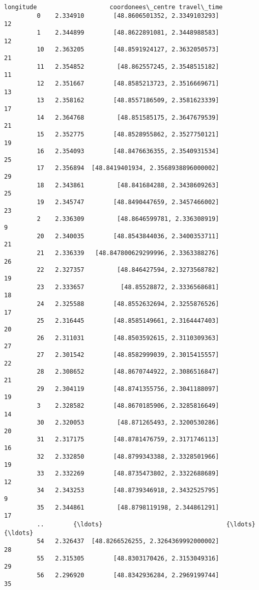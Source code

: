 \documentclass[11pt]{article}
\begin{document}
\begin{Verbatim}[commandchars=\\\{\}]
             longitude                    coordonees\_centre travel\_time  
         0    2.334910        [48.8606501352, 2.3349103293]          12  
         1    2.344899        [48.8622891081, 2.3448988583]          12  
         10   2.363205        [48.8591924127, 2.3632050573]          21  
         11   2.354852         [48.862557245, 2.3548515182]          11  
         12   2.351667        [48.8585213723, 2.3516669671]          13  
         13   2.358162        [48.8557186509, 2.3581623339]          17  
         14   2.364768         [48.851585175, 2.3647679539]          21  
         15   2.352775        [48.8528955862, 2.3527750121]          19  
         16   2.354093        [48.8476636355, 2.3540931534]          25  
         17   2.356894  [48.8419401934, 2.3568938896000002]          29  
         18   2.343861         [48.841684288, 2.3438609263]          25  
         19   2.345747        [48.8490447659, 2.3457466002]          23  
         2    2.336309         [48.8646599781, 2.336308919]           9  
         20   2.340035        [48.8543844036, 2.3400353711]          21  
         21   2.336339   [48.847800629299996, 2.3363388276]          26  
         22   2.327357         [48.846427594, 2.3273568782]          19  
         23   2.333657          [48.85528872, 2.3336568681]          18  
         24   2.325588        [48.8552632694, 2.3255876526]          17  
         25   2.316445        [48.8585149661, 2.3164447403]          20  
         26   2.311031        [48.8503592615, 2.3110309363]          27  
         27   2.301542        [48.8582999039, 2.3015415557]          22  
         28   2.308652        [48.8670744922, 2.3086516847]          21  
         29   2.304119        [48.8741355756, 2.3041188097]          19  
         3    2.328582        [48.8670185906, 2.3285816649]          14  
         30   2.320053         [48.871265493, 2.3200530286]          20  
         31   2.317175        [48.8781476759, 2.3171746113]          16  
         32   2.332850        [48.8799343388, 2.3328501966]          19  
         33   2.332269        [48.8735473802, 2.3322688689]          12  
         34   2.343253        [48.8739346918, 2.3432525795]           9  
         35   2.344861         [48.8798119198, 2.344861291]          17  
         ..        {\ldots}                                  {\ldots}         {\ldots}  
         54   2.326437  [48.8266526255, 2.3264369992000002]          28  
         55   2.315305        [48.8303170426, 2.3153049316]          29  
         56   2.296920        [48.8342936284, 2.2969199744]          35  

\end{Verbatim}
\end{document}
